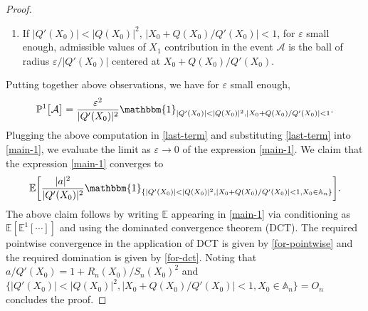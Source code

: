 \documentclass[9pt,a4paper,reqno]{amsart}
\theoremstyle{mine}
\theoremstyle{definition}
\theoremstyle{remark}
\renewcommand\epsilon{\varepsilon}
\newcommand{\mb}{\mathbb}
\begin{document}
\begin{proof}
\begin{enumerate}
\item If $|Q'(X_0)| < |Q(X_0)|^2$, \hspace{1mm} $|X_0 + Q(X_0)/Q'(X_0)| < 1$, for $\epsilon$ small enough, admissible values of $X_1$ contribution in the event $\mathcal{A}$ is the ball of radius $\epsilon/|Q'(X_0)|$ centered at $X_0 + Q(X_0)/Q'(X_0)$. 

\end{enumerate}

Putting together above observations, we have for $\epsilon$ small enough, 
\begin{equation}\label{for-pointwise}
\mb{P}^1\bigl[\mathcal{A}\bigr] = \frac{\epsilon^2}{|Q'(X_0)|^2} \mathbbm{1}_{|Q'(X_0)| < |Q(X_0)|^2, |X_0 + Q(X_0)/Q'(X_0)| < 1}.
\end{equation} 
Plugging the above computation in \eqref{last-term} and substituting \eqref{last-term} into \eqref{main-1}, we evaluate the limit as $\epsilon \to 0$ of the expression \eqref{main-1}. We claim that the expression \eqref{main-1} converges to 
\[ \mb{E}\biggl[ \frac{|a|^2}{|Q'(X_0)|^2} \mathbbm{1}_{\{|Q'(X_0)| < |Q(X_0)|^2, |X_0 + Q(X_0)/Q'(X_0)| < 1, X_0 \in \mb{A}_n\}}\biggr].\]
The above claim follows by writing $\mb{E}$ appearing in \eqref{main-1} via conditioning as $\mb{E}[\mb{E}^1[\cdots]]$ and using the dominated convergence theorem (DCT). The required pointwise convergence in the application of DCT is given by \eqref{for-pointwise} and the required domination is given by \eqref{for-dct}. Noting that $a/Q'(X_0) = 1 + R_n(X_0)/S_n(X_0)^2$ and $\{|Q'(X_0)| < |Q(X_0)|^2, |X_0 + Q(X_0)/Q'(X_0)| < 1, X_0 \in \mb{A}_n\} = O_n$ concludes the proof. 
\end{proof}



\end{document}
